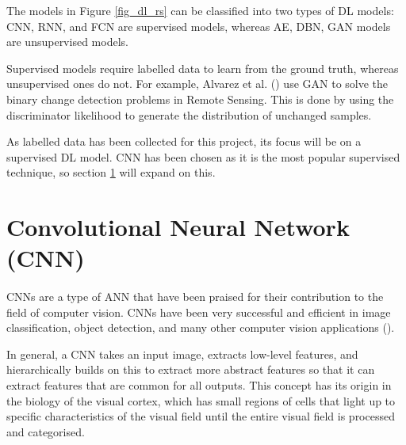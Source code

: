 The models in Figure \ref{fig_dl_rs} can be classified into two types of \gls{DL} models: \gls{CNN}, \gls{RNN}, and \gls{FCN} are supervised models, whereas \gls{AE}, \gls{DBN}, \gls{GAN} models are unsupervised models. 

Supervised models require labelled data to learn from the ground truth, whereas unsupervised ones do not. For example, Alvarez et al. (\cite{alvarez2020s2cgan}) use \gls{GAN} to solve the binary change detection problems in Remote Sensing. This is done by using the discriminator likelihood to generate the distribution of unchanged samples.

As labelled data has been collected for this project, its focus will be on a supervised \gls{DL} model. \gls{CNN} has been chosen as it is the most popular supervised technique, so section \ref{cnn_sect} will expand on this.



\section{Convolutional Neural Network (CNN)} \label{cnn_sect}
\paragraph{}
\gls{CNN}s are a type of \gls{ANN} that have been praised for their contribution to the field of computer vision. \gls{CNN}s have been very successful and efficient in image classification, object detection, and many other computer vision applications (\cite{GoodBengCour16}).

In general, a \gls{CNN} takes an input image, extracts low-level features, and hierarchically builds on this to extract more abstract features so that it can extract features that are common for all outputs. This concept has its origin in the biology of the visual cortex, which has small regions of cells that light up to specific characteristics of the visual field until the entire visual field is processed and categorised.

